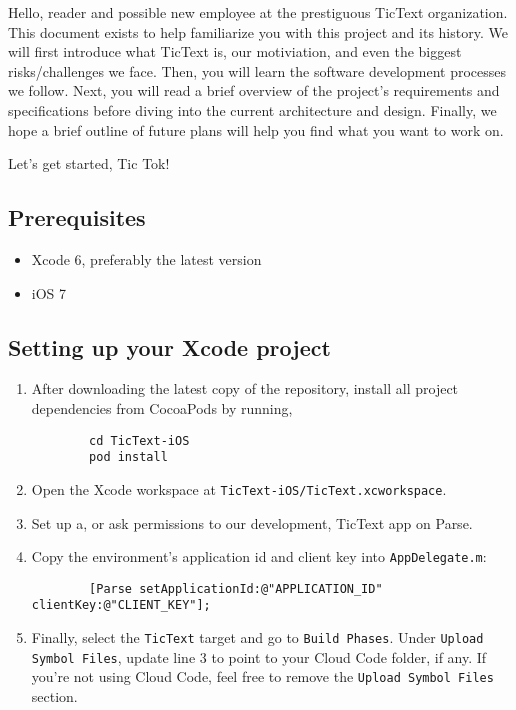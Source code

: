 Hello, reader and possible new employee at the prestiguous TicText organization. This document exists to help familiarize you with this project and its history. We will first introduce what TicText is, our motiviation, and even the biggest risks/challenges we face. Then, you will learn the software development processes we follow. Next, you will read a brief overview of the project's requirements and specifications before diving into the current architecture and design. Finally, we hope a brief outline of future plans will help you find what you want to work on.

\begin{flushright}
Let's get started, Tic Tok!
\end{flushright}

\subsection{Prerequisites}
\begin{itemize}
	\item Xcode 6, preferably the latest version
	\item iOS 7
\end{itemize}

\subsection{Setting up your Xcode project}
\begin{enumerate}
	\item After downloading the latest copy of the repository, install all project dependencies from CocoaPods by running,
		\begin{verbatim}
		cd TicText-iOS
		pod install
		\end{verbatim}
	\item Open the Xcode workspace at \verb|TicText-iOS/TicText.xcworkspace|.
	\item Set up a, or ask permissions to our development, TicText app on Parse.
	\item Copy the environment's application id and client key into \verb|AppDelegate.m|:
		\begin{verbatim}
		[Parse setApplicationId:@"APPLICATION_ID" clientKey:@"CLIENT_KEY"];
		\end{verbatim}
	\item Finally, select the \verb|TicText| target and go to \verb|Build Phases|. Under \verb|Upload Symbol Files|, update line 3 to point to your Cloud Code folder, if any. If you're not using Cloud Code, feel free to remove the \verb|Upload Symbol Files| section.
\end{enumerate}

